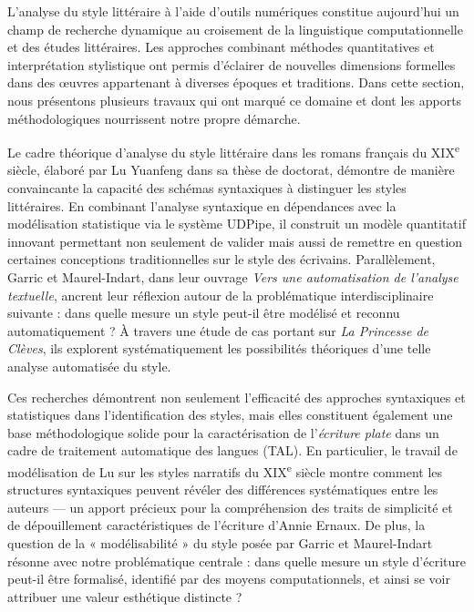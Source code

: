 L’analyse du style littéraire à l’aide d’outils numériques constitue aujourd’hui un champ de recherche dynamique au croisement de la linguistique computationnelle et des études littéraires. Les approches combinant méthodes quantitatives et interprétation stylistique ont permis d’éclairer de nouvelles dimensions formelles dans des œuvres appartenant à diverses époques et traditions. Dans cette section, nous présentons plusieurs travaux qui ont marqué ce domaine et dont les apports méthodologiques nourrissent notre propre démarche.\\

\par Le cadre théorique d’analyse du style littéraire dans les romans français du XIX\textsuperscript{e} siècle, élaboré par Lu Yuanfeng dans sa thèse de doctorat, démontre de manière convaincante la capacité des schémas syntaxiques à distinguer les styles littéraires. En combinant l’analyse syntaxique en dépendances avec la modélisation statistique via le système UDPipe, il construit un modèle quantitatif innovant permettant non seulement de valider mais aussi de remettre en question certaines conceptions traditionnelles sur le style des écrivains. Parallèlement, Garric et Maurel-Indart, dans leur ouvrage \textit{Vers une automatisation de l’analyse textuelle}, ancrent leur réflexion autour de la problématique interdisciplinaire suivante : dans quelle mesure un style peut-il être modélisé et reconnu automatiquement ? À travers une étude de cas portant sur \textit{La Princesse de Clèves}, ils explorent systématiquement les possibilités théoriques d’une telle analyse automatisée du style.\\

\par Ces recherches démontrent non seulement l’efficacité des approches syntaxiques et statistiques dans l’identification des styles, mais elles constituent également une base méthodologique solide pour la caractérisation de l’\textit{écriture plate} dans un cadre de traitement automatique des langues (TAL). En particulier, le travail de modélisation de Lu sur les styles narratifs du XIX\textsuperscript{e} siècle montre comment les structures syntaxiques peuvent révéler des différences systématiques entre les auteurs — un apport précieux pour la compréhension des traits de simplicité et de dépouillement caractéristiques de l’écriture d’Annie Ernaux. De plus, la question de la « modélisabilité » du style posée par Garric et Maurel-Indart résonne avec notre problématique centrale : dans quelle mesure un style d’écriture peut-il être formalisé, identifié par des moyens computationnels, et ainsi se voir attribuer une valeur esthétique distincte ?\\

